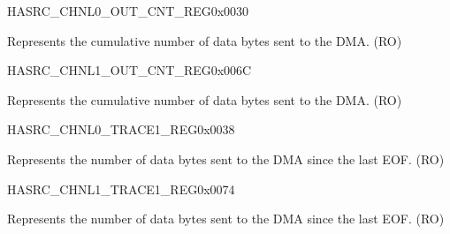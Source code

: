 \begin{register}{H}{ASRC\_CHNL0\_OUT\_CNT\_REG}{0x0030}\label{regdesc:ASRCCHNL0OUTCNTREG}
%
%
\regnewline%
\begin{regdesc}\begin{reglist}
\label{fielddesc:ASRCCHNL0OUTCNT}\item [ASRC\_CHNL0\_OUT\_CNT] Represents the cumulative number of data bytes sent to the DMA. (RO)
\end{reglist}\end{regdesc}
\end{register}


\begin{register}{H}{ASRC\_CHNL1\_OUT\_CNT\_REG}{0x006C}\label{regdesc:ASRCCHNL1OUTCNTREG}
%
%
\regnewline%
\begin{regdesc}\begin{reglist}
\label{fielddesc:ASRCCHNL1OUTCNT}\item [ASRC\_CHNL1\_OUT\_CNT] Represents the cumulative number of data bytes sent to the DMA. (RO)
\end{reglist}\end{regdesc}
\end{register}


\begin{register}{H}{ASRC\_CHNL0\_TRACE1\_REG}{0x0038}\label{regdesc:ASRCCHNL0TRACE1REG}
%
%
\regnewline%
\begin{regdesc}\begin{reglist}
\label{fielddesc:ASRCCHNL0OUTINC}\item [ASRC\_CHNL0\_OUT\_INC] Represents the number of data bytes sent to the DMA since the last EOF. (RO)
\end{reglist}\end{regdesc}
\end{register}


\begin{register}{H}{ASRC\_CHNL1\_TRACE1\_REG}{0x0074}\label{regdesc:ASRCCHNL1TRACE1REG}
%
%
\regnewline%
\begin{regdesc}\begin{reglist}
\label{fielddesc:ASRCCHNL1OUTINC}\item [ASRC\_CHNL1\_OUT\_INC] Represents the number of data bytes sent to the DMA since the last EOF. (RO)
\end{reglist}\end{regdesc}
\end{register}


